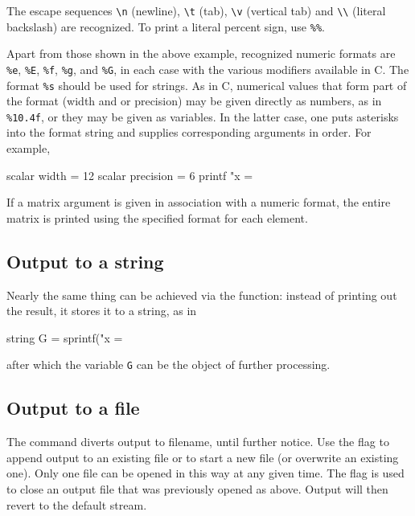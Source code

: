 The escape sequences \verb|\n| (newline), \verb|\t| (tab), \verb|\v|
(vertical tab) and \verb|\\| (literal backslash) are recognized. To
print a literal percent sign, use \verb|%%|.

Apart from those shown in the above example, recognized numeric
formats are \verb|%e|, \verb|%E|, \verb|%f|, \verb|%g|, and \verb|%G|,
in each case with the various modifiers available in C. The format
\verb|%s| should be used for strings. As in C, numerical values that
form part of the format (width and or precision) may be given directly
as numbers, as in \verb|%10.4f|, or they may be given as variables. In
the latter case, one puts asterisks into the format string and
supplies corresponding arguments in order. For example,

\begin{code}
  scalar width = 12 
  scalar precision = 6 
  printf "x = %
\end{code}

If a matrix argument is given in association with a numeric format,
the entire matrix is printed using the specified format for each
element. 

\subsection{Output to a string}
\label{sec:sprintf}

Nearly the same thing can be achieved via the  function:
instead of printing out the result, it stores it to a string, as in 
\begin{code}
  string G = sprintf("x = %
\end{code}
after which the variable \texttt{G} can be the object of further
processing.


\subsection{Output to a file}
\label{sec:outfile}

The  command diverts output to filename, until further
notice. Use the flag  to append output to an existing
file or  to start a new file (or overwrite an existing
one). Only one file can be opened in this way at any given
time. The  flag is used to close an output file that was
previously opened as above. Output will then revert to the default
stream.

